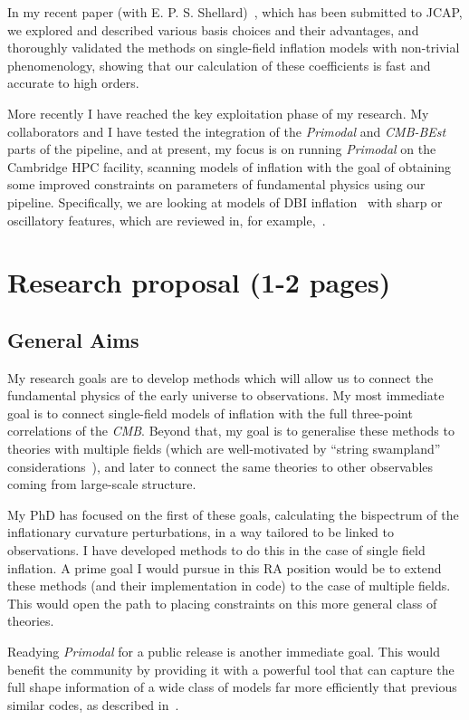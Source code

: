 In my recent paper (with E. P. S. Shellard)~\cite{probing_precision}, which has been submitted to JCAP,
we explored and described various basis choices and their advantages, and thoroughly validated the methods on single-field inflation models with non-trivial phenomenology, showing that our calculation of these coefficients is fast and accurate to high orders.


More recently I have reached the key exploitation phase of my research.
My collaborators and I have tested the integration of the \textit{Primodal} and \textit{CMB-BEst}
parts of the pipeline, and at present, my focus is on running \textit{Primodal} on the Cambridge HPC facility,
scanning models of inflation with the goal of obtaining some improved constraints on parameters of fundamental
physics using our pipeline.
Specifically, we are looking at models of DBI inflation~\cite{dbi_in_the_sky} with sharp or
oscillatory features, which are reviewed in, for example,~\cite{astro2020_features}.


\section*{Research proposal (1-2 pages)}
\subsection*{General Aims}
My research goals are to develop methods which will allow us to connect the fundamental physics of the early universe to observations.
My most immediate goal is to connect single-field models of inflation with the full three-point correlations of the \textit{CMB}.
Beyond that, my goal is to generalise these methods to theories with multiple fields
(which are well-motivated by ``string swampland'' considerations~\cite{achucarro_multifield1}),
and later to connect the same theories to other observables coming from large-scale structure.

My PhD has focused on the first of these goals,
calculating the bispectrum of the inflationary curvature perturbations, in a way tailored to be linked to observations.
I have developed methods to do this in the case of single field inflation.
A prime goal I would pursue in this RA position would be to extend these methods (and their implementation in code)
to the case of multiple fields. This would open the path to placing constraints on this
more general class of theories.

Readying \textit{Primodal} for a public release is another immediate goal.
This would benefit the community by providing it with a powerful tool
that can capture the full shape information of a wide class of models far more efficiently
that previous similar codes, as described in~\cite{probing_precision}.


